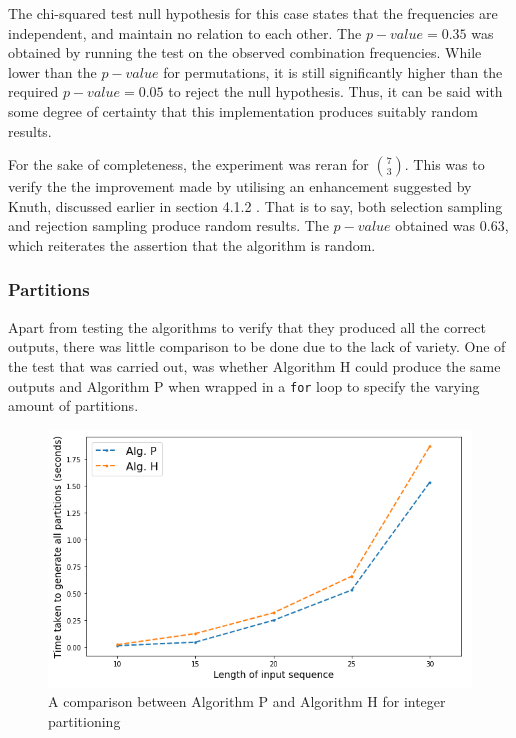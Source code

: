 \documentclass[12pt]{article}
\begin{document}
The chi-squared test null hypothesis for this case states that the frequencies are independent, and maintain no relation to each other. The \(p-value=0.35\) was obtained by running the test on the observed combination frequencies. While lower than the \(p-value\) for permutations, it is still significantly higher than the required \(p-value=0.05\) to reject the null hypothesis. Thus, it can be said with some degree of certainty that this implementation produces suitably random results.

For the sake of completeness, the experiment was reran for \(7 \choose 3\). This was to verify the the improvement made by utilising an enhancement suggested by Knuth, discussed earlier in section 4.1.2 \cite{rand_comb}. That is to say, both selection sampling and rejection sampling produce random results. The \(p-value\) obtained was \(0.63\), which reiterates the assertion that the algorithm is random.

\subsubsection{Partitions}
Apart from testing the algorithms to verify that they produced all the correct outputs, there was little comparison to be done due to the lack of variety. One of the test that was carried out, was whether Algorithm H \cite{int_part_H} could produce the same outputs and Algorithm P \cite{int_part_P} when wrapped in a \lstinline{for} loop to specify the varying amount of partitions. 

\begin{figure}[h]
\centering
\includegraphics[width=1.0\textwidth]{images/int_part_graph.PNG}
\caption{A comparison between Algorithm P \cite{int_part_P} and Algorithm H \cite{int_part_H} for integer partitioning}
\end{figure}
\end{document}
